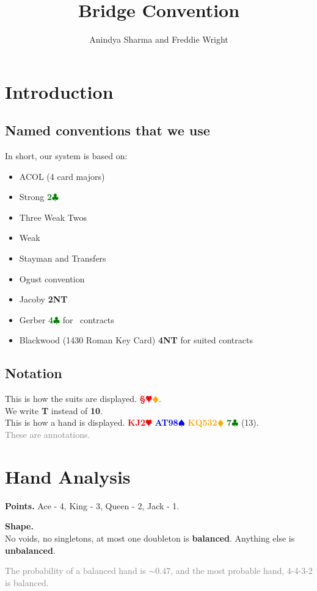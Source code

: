 \documentclass{article}
\title{Bridge Convention}
\author{Anindya Sharma and Freddie Wright}
\date{}
\newcommand{\Hs}{\textcolor{Red}{$\varheart$}}
\newcommand{\Ss}{\textcolor{Blue}{$\spadesuit$}}
\newcommand{\Ds}{\textcolor{Orange}{$\vardiamond$}}
\newcommand{\Cs}{\textcolor{Green}{$\clubsuit$}}
\newcommand{\NTs}{\textbf{\footnotesize{NT}}}
\renewcommand{\H}[1]{\textcolor{Red}{\textbf{#1}\Hs}}
\renewcommand{\S}[1]{\textcolor{Blue}{\textbf{#1}\Ss}}
\newcommand{\D}[1]{\textcolor{Orange}{\textbf{#1}\Ds}}
\newcommand{\C}[1]{\textcolor{Green}{\textbf{#1}\Cs}}
\newcommand{\NT}[1]{\textbf{#1\NTs}}
\newcommand{\note}[1]{\textcolor{gray}{#1}}
\begin{document}
\maketitle

\section{Introduction}

\subsection{Named conventions that we use}
In short, our system is based on:
\begin{itemize}
    \item ACOL (4 card majors)
    \item Strong \C{2}
    \item Three Weak Twos
    \item Weak\NT~
    \item Stayman and Transfers
    \item Ogust convention
    \item Jacoby \NT{2}
    \item Gerber \C{4} for\NT~ contracts
    \item Blackwood (1430 Roman Key Card) \NT{4} for suited contracts
\end{itemize}

\subsection{Notation}
This is how the suits are displayed. \H \S \D \C.\\
We write \textbf{T} instead of \textbf{10}.\\
This is how a hand is displayed. \H{KJ2} \S{AT98} \D{KQ532} \C{7} (13).\\
\note{These are annotations.}

\section{Hand Analysis}

\textbf{Points.} Ace - 4, King - 3, Queen - 2, Jack - 1.

\textbf{Shape.}\\ No voids, no singletons, at most one doubleton is \textbf{balanced}. Anything else is \textbf{unbalanced}.

\note{The probability of a balanced hand is $\sim 0.47$, and the most probable hand, 4-4-3-2 is balanced.}
\end{document}
